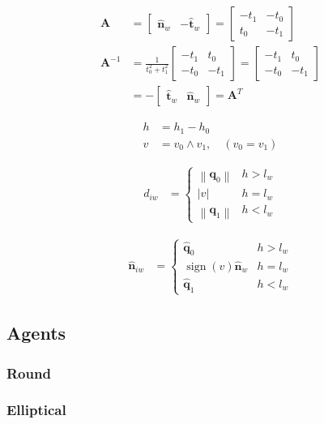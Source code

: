 \begin{align}
\mathbf{A} 
&= \begin{bmatrix} \hat{\mathbf{n}}_{w} & -\hat{\mathbf{t}}_{w} \end{bmatrix} 
= \left[\begin{matrix}- t_{1} & - t_{0}\\t_{0} & - t_{1}\end{matrix}\right] \\
\mathbf{A}^{-1} 
&= \frac{1}{t_{0}^{2} + t_{1}^{2}} \left[\begin{matrix}- t_{1} & t_{0}\\- t_{0} & - t_{1}\end{matrix}\right]
= \left[\begin{matrix}- t_{1} & t_{0}\\- t_{0} & - t_{1}\end{matrix}\right] \\
&= - \begin{bmatrix} \hat{\mathbf{t}}_{w} & \hat{\mathbf{n}}_{w} \end{bmatrix} = \mathbf{A}^{T}
\end{align}

\begin{align}
h &= h_{1} - h_{0} \\
v &= v_{0} \wedge v_{1},\quad (v_{0} = v_{1})
\end{align}

\begin{align}
d_{iw} &=
\begin{cases}
\left\|\mathbf{q}_{0}\right\| & h > l_{w} \\
\left|v\right| & h = l_{w} \\
\left\|\mathbf{q}_{1}\right\| & h < l_{w}
\end{cases}
\end{align}

\begin{align}
\hat{\mathbf{n}}_{iw} &=
\begin{cases}
\hat{\mathbf{q}}_{0} & h > l_{w} \\
\operatorname{sign}(v)\hat{\mathbf{n}}_{w} & h = l_{w} \\
\hat{\mathbf{q}}_{1} & h < l_{w}
\end{cases}
\end{align}


\subsection{Agents}
\subsubsection{Round}
\subsubsection{Elliptical}

